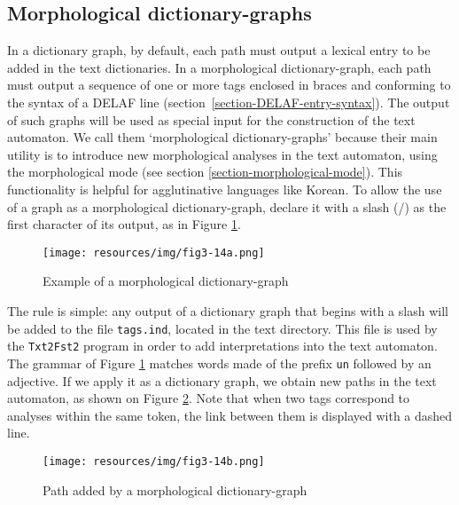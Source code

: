 \subsection{Morphological dictionary-graphs}
\label{section-morphological-dictionary-graphs}
In a dictionary graph, by default, each path must output a lexical entry to be added in the text
dictionaries. In a morphological dictionary-graph, each path must output
a sequence of one or more tags enclosed in braces and conforming to the syntax
of a DELAF line (section~\ref{section-DELAF-entry-syntax}). The output
of such graphs will be used as special input for the construction of the text
automaton. We call them `morphological dictionary-graphs' because their
main utility is to introduce new morphological analyses in the text automaton,
using the morphological mode (see section \ref{section-morphological-mode}).
This functionality is helpful for agglutinative languages like Korean. To allow the use of a
graph as a morphological dictionary-graph, declare it with a slash (/) as the first
character of its output, as in Figure \ref{morphoA}.


\begin{figure}[!ht]
\begin{center}
\texttt{[image: resources/img/fig3-14a.png]}
\caption{Example of a morphological dictionary-graph\label{morphoA}}
\end{center}
\end{figure}

\noindent The rule is simple: any output of a dictionary graph that begins
with a slash will be added to the file \verb+tags.ind+, 
located in the text directory. This file is used by the \verb+Txt2Fst2+ program
in order to add interpretations into the text automaton. The
grammar of Figure \ref{morphoA} matches words made of the prefix
\verb+un+ followed by an adjective. If we apply it as a dictionary
graph, we obtain new paths in the text automaton, as shown on Figure
\ref{morphoB}. Note that when two tags correspond to analyses within the same
token, the link between them is displayed with a dashed line.

\begin{figure}[!ht]
\begin{center}
\texttt{[image: resources/img/fig3-14b.png]}
\caption{Path added by a morphological dictionary-graph\label{morphoB}}
\end{center}
\end{figure}


